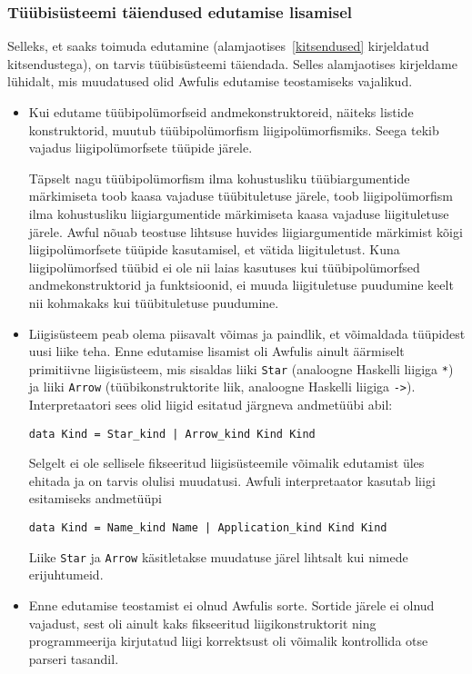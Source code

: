 \documentclass[12pt]{article}
\begin{document}
      \subsubsection{Tüübisüsteemi täiendused edutamise lisamisel}
        Selleks, et saaks toimuda edutamine (alamjaotises~\ref{kitsendused} kirjeldatud kitsendustega), on tarvis tüübisüsteemi täiendada. Selles alamjaotises kirjeldame lühidalt, mis muudatused olid Awfulis edutamise teostamiseks vajalikud.

        \begin{itemize}
          \item
            Kui edutame tüübipolümorfseid andmekonstruktoreid, näiteks listide konstruktorid, muutub tüübipolümorfism liigipolümorfismiks. Seega tekib vajadus liigipolümorfsete tüüpide järele.

            Täpselt nagu tüübipolümorfism ilma kohustusliku tüübiargumentide märkimiseta toob kaasa vajaduse tüübituletuse järele, toob liigipolümorfism ilma kohustusliku liigiargumentide märkimiseta kaasa vajaduse liigituletuse järele. Awful nõuab teostuse lihtsuse huvides liigiargumentide märkimist kõigi liigipolümorfsete tüüpide kasutamisel, et vätida liigituletust. Kuna liigipolümorfsed tüübid ei ole nii laias kasutuses kui tüübipolümorfsed andmekonstruktorid ja funktsioonid, ei muuda liigituletuse puudumine keelt nii kohmakaks kui tüübituletuse puudumine.
          \item
            Liigisüsteem peab olema piisavalt võimas ja paindlik, et võimaldada tüüpidest uusi liike teha. Enne edutamise lisamist oli Awfulis ainult äärmiselt primitiivne liigisüsteem, mis sisaldas liiki \verb!Star! (analoogne Haskelli liigiga \verb!*!) ja liiki \verb!Arrow! (tüübikonstruktorite liik, analoogne Haskelli liigiga \verb!->!). Interpretaatori sees olid liigid esitatud järgneva andmetüübi abil:

            \begin{verbatim}data Kind = Star_kind | Arrow_kind Kind Kind\end{verbatim}

            Selgelt ei ole sellisele fikseeritud liigisüsteemile võimalik edutamist üles ehitada ja on tarvis olulisi muudatusi. Awfuli interpretaator kasutab liigi esitamiseks andmetüüpi

            \begin{verbatim}data Kind = Name_kind Name | Application_kind Kind Kind\end{verbatim}

            Liike \verb!Star! ja \verb!Arrow! käsitletakse muudatuse järel lihtsalt kui nimede erijuhtumeid.
          \item
            Enne edutamise teostamist ei olnud Awfulis sorte. Sortide järele ei olnud vajadust, sest oli ainult kaks fikseeritud liigikonstruktorit ning programmeerija kirjutatud liigi korrektsust oli võimalik kontrollida otse parseri tasandil.


\end{itemize}
\end{document}
